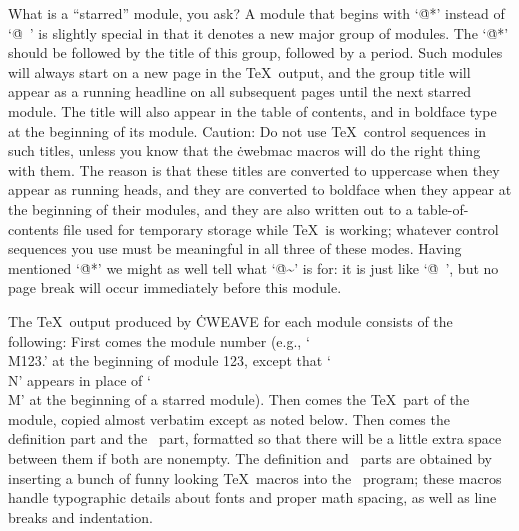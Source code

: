 What is a ``starred'' module, you ask? A module that begins with `\.{@*}'
instead of `\.{@\ }' is slightly special in that it denotes a new major
group of modules. The `\.{@*}' should be followed by the title of this
group, followed by a period. Such modules will always start on a new page
in the \TeX\ output, and the group title will appear as a running headline
on all subsequent pages until the next starred module. The title will also
appear in the table of contents, and in boldface type at the beginning of
its module. Caution:  Do not use \TeX\ control sequences in such titles,
unless you know that the \.{cwebmac} macros will do the right thing with
them. The reason is that these titles are converted to uppercase when
they appear as running heads, and they are converted to boldface when they
appear at the beginning of their modules, and they are also written out to
a table-of-contents file used for temporary storage while \TeX\ is
working; whatever control sequences you use must be meaningful in all
three of these modes. Having mentioned `\.{@*}' we might as well tell what
 `\.{@\~}' is for: it is just like `\.{@\ }', but no page break will occur
immediately before this module.

The \TeX\ output produced by \.{CWEAVE} for each module consists of
the following: First comes the module number (e.g., `\.{\\M123.}'
at the beginning of module 123, except that `\.{\\N}' appears in place of
`\.{\\M}' at the beginning of a starred module). Then comes the
\TeX\ part of the module, copied almost verbatim except as noted
below. Then comes the definition part and the \Cee\ part, formatted
so that there will be a little extra space between them if both are
nonempty. The definition and \Cee\ parts are obtained by inserting
a bunch of funny looking \TeX\ macros into the \Cee\ program; these
macros handle typographic details about fonts and proper math spacing,
as well as line breaks and indentation.

